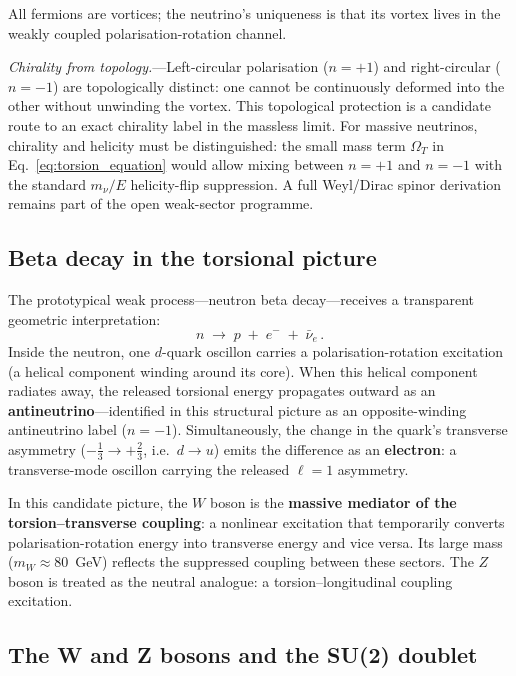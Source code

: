 \documentclass[11pt]{article}
\begin{document}
All fermions are vortices; the neutrino's
uniqueness is that its vortex lives in the
weakly coupled polarisation-rotation channel.

\textit{Chirality from topology.}---Left-circular
polarisation ($n = +1$) and right-circular
($n = -1$) are topologically distinct: one cannot
be continuously deformed into the other without
unwinding the vortex.  This topological protection
is a candidate route to an exact chirality label
in the massless limit.  For massive neutrinos,
chirality and helicity must be distinguished: the
small mass term $\Omega_T$ in
Eq.~\eqref{eq:torsion_equation} would allow mixing
between $n = +1$ and $n = -1$ with the standard
$m_\nu/E$ helicity-flip suppression.  A full
Weyl/Dirac spinor derivation remains part of the
open weak-sector programme.

\subsection{Beta decay in the torsional picture}
\label{sec:beta_decay}

The prototypical weak process---neutron beta
decay---receives a transparent geometric
interpretation:
\[
  n \;\to\; p \;+\; e^- \;+\; \bar{\nu}_e\,.
\]
Inside the neutron, one $d$-quark oscillon
carries a polarisation-rotation excitation
(a helical component winding around its core).
When this helical component radiates away, the
released torsional energy propagates outward as
an \textbf{antineutrino}---identified in this structural
picture as an opposite-winding antineutrino label
($n = -1$).  Simultaneously, the change
in the quark's transverse asymmetry
($-\tfrac{1}{3} \to +\tfrac{2}{3}$, i.e.\
$d \to u$) emits the difference as an
\textbf{electron}: a transverse-mode oscillon
carrying the released $\ell = 1$ asymmetry.

In this candidate picture, the $W$ boson is the
\textbf{massive mediator of the torsion--transverse
coupling}: a nonlinear excitation that temporarily
converts polarisation-rotation energy into transverse
energy and vice versa.  Its large mass
($m_W \approx 80$~GeV) reflects the suppressed
coupling between these sectors.  The $Z$ boson
is treated as the neutral analogue: a
torsion--longitudinal coupling excitation.

\subsection{The W and Z bosons and the SU(2)
doublet}
\label{sec:WZ_bosons}
\end{document}
